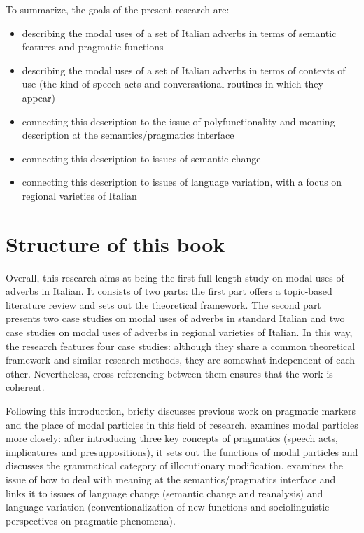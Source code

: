 To summarize, the goals of the present research are:

\begin{itemize}
\item describing the modal uses of a set of Italian adverbs in terms of semantic features and pragmatic functions
\item describing the modal uses of a set of Italian adverbs in terms of contexts of use (the kind of speech acts and conversational routines in which they appear)
\item connecting this description to the issue of polyfunctionality and meaning description at the semantics/pragmatics interface
\item connecting this description to issues of semantic change
\item connecting this description to issues of language variation, with a focus on regional varieties of Italian
\end{itemize}
\section{Structure of this book}
\hypertarget{Toc124860609}{}
Overall, this research aims at being the first full-length study on modal uses of adverbs in Italian. It consists of two parts: the first part offers a topic-based literature review and sets out the theoretical framework. The second part presents two case studies on modal uses of adverbs in standard Italian and two case studies on modal uses of adverbs in regional varieties of Italian. In this way, the research features four case studies: although they share a common theoretical framework and similar research methods, they are somewhat independent of each other. Nevertheless, cross-referencing between them ensures that the work is coherent.

Following this introduction,  briefly discusses previous work on pragmatic markers and the place of modal particles in this field of research.  examines modal particles more closely: after introducing three key concepts of pragmatics (speech acts, implicatures and presuppositions), it sets out the functions of modal particles and discusses the grammatical category of illocutionary modification.  examines the issue of how to deal with meaning at the semantics/pragmatics interface and links it to issues of language change (semantic change and reanalysis) and language variation (conventionalization of new functions and sociolinguistic perspectives on pragmatic phenomena).

